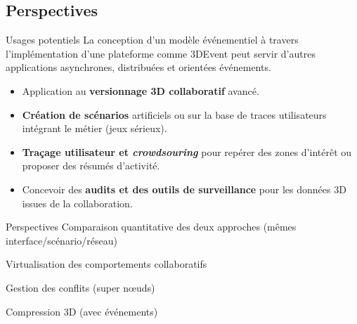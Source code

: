 \subsection{Perspectives}
\begin{frame}{Usages potentiels}
	La conception d'un modèle événementiel à travers l'implémentation d'une 
	plateforme 
	comme 3DEvent peut servir d'autres applications 
	asynchrones, distribuées et orientées événements.
	\begin{itemize}
		\item Application au \textbf{versionnage 3D collaboratif }avancé.
		\item \textbf{Création de scénarios} artificiels ou sur la base de traces 
		utilisateurs 
		intégrant le métier (jeux sérieux).
		\item \textbf{Traçage utilisateur et \textit{crowdsouring}} pour repérer des 
		zones d'intérêt ou proposer des résumés d'activité.
		\item Concevoir des \textbf{audits et  des outils de surveillance} pour les 
		données 
		3D issues de la collaboration.
		
	\end{itemize}
\end{frame}




\begin{frame}{Perspectives}
	Comparaison quantitative des deux approches (mêmes 
	interface/scénario/réseau)
	
	Virtualisation des comportements collaboratifs \cite{Haque2016}\cite{Erb2014}
	
	Gestion des conflits (super n\oe uds)
	\cite{Klamer2013a} %
	\cite{Baldoni2007}
	
	
	Compression 3D \cite{Maglo2013a} (avec événements) 
\end{frame}